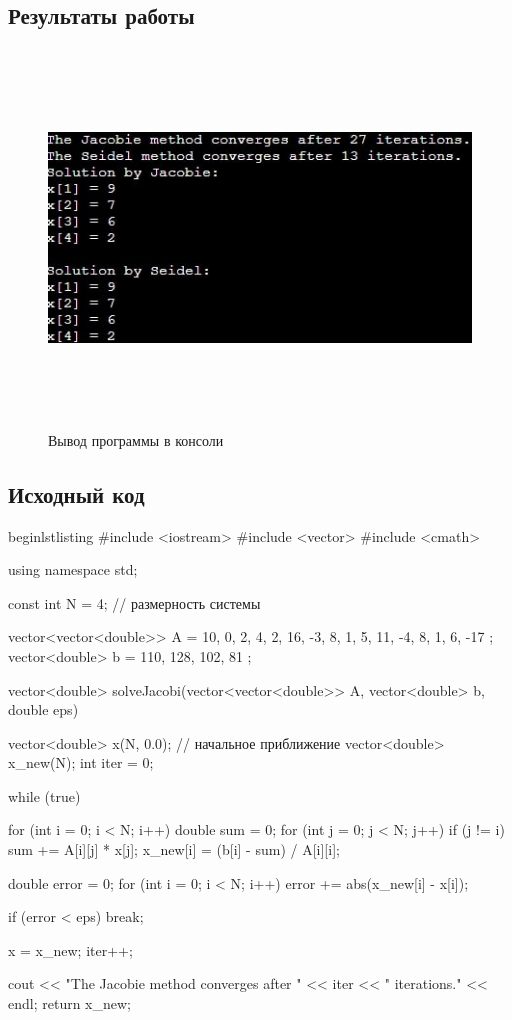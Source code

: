 \subsection{Результаты работы}
\begin{figure}[h!]
\centering
\includegraphics[width=15cm, height=10cm]{img/img3.jpg}
\caption{Вывод программы в консоли}
\end{figure}


\pagebreak

\subsection{Исходный код}
begin{lstlisting}
#include <iostream>
#include <vector>
#include <cmath>

using namespace std;

const int N = 4; // размерность системы

vector<vector<double>> A = { {10, 0, 2, 4}, {2, 16, -3, 8}, {1, 5, 11, -4}, {8, 1, 6, -17} };
vector<double> b = { 110, 128, 102, 81 };

vector<double> solveJacobi(vector<vector<double>> A, vector<double> b, double eps) {
    vector<double> x(N, 0.0); // начальное приближение
    vector<double> x_new(N);
    int iter = 0;

    while (true) {
        for (int i = 0; i < N; i++) {
            double sum = 0;
            for (int j = 0; j < N; j++) {
                if (j != i) {
                    sum += A[i][j] * x[j];
                }
            }
            x_new[i] = (b[i] - sum) / A[i][i];
        }

        double error = 0;
        for (int i = 0; i < N; i++) {
            error += abs(x_new[i] - x[i]);
        }

        if (error < eps) {
            break;
        }

        x = x_new;
        iter++;
    }

    cout << "The Jacobie method converges after " << iter << " iterations." << endl;
    return x_new;
}

